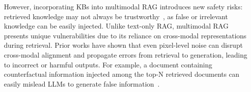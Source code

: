 However, incorporating KBs into multimodal RAG introduces new safety risks: retrieved knowledge may not always be trustworthy~\cite{hong-etal-2024-gullible, tamber2025illusions}, as false or irrelevant knowledge can be easily injected. Unlike text-only RAG, multimodal RAG presents unique vulnerabilities due to its reliance on cross-modal representations during retrieval. Prior works \cite{yin2024vlattack, wu2024adversarial, schlarmann2023adversarial} have shown that even pixel-level noise can disrupt cross-modal alignment and propagate errors from retrieval to generation, leading to incorrect or harmful outputs.
For example, a document containing counterfactual information injected among the top-N retrieved documents can easily mislead LLMs to generate false information~\cite{hong-etal-2024-gullible}.


